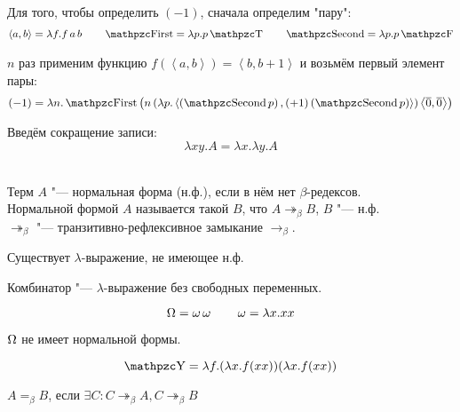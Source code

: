 Для того, чтобы определить $(-1)$, сначала определим "пару":
\begin{align*}
    \left<a,b\right> = \lambda f.f \mathinner{a} b \qquad
    \comb{First} = \lambda p . p \T \qquad
    \comb{Second} = \lambda p . p \F
\end{align*}

$n$ раз применим функцию $f\left(\left<a,b\right>\right) = \left<b,b+1\right>$ и возьмём первый элемент пары:
\[
    (-1) = \lambda n . \comb{First}
        \left(n \mathinner{(\lambda p . \left<\left(\comb{Second} p\right), \mathinner{(+1)} (\comb{Second} p)\right>)}
        \left<\overline{0},\overline{0}\right>\right)
\]

Введём сокращение записи:
\[
    \lambda x y . A = \lambda x . \lambda y . A
\]

\begin{definition} \mbox{} \\
    Терм $A$ "--- нормальная форма (н.ф.), если в нём нет $\beta$-редексов. \\
    Нормальной формой $A$ называется такой $B$, что $A \twoheadrightarrow_{\beta} B$, $B$ "--- н.ф. \\
    $\twoheadrightarrow_{\beta}$ "--- транзитивно-рефлексивное замыкание $\rightarrow_{\beta}$.
\end{definition}

\begin{statement}
    Существует $\lambda$-выражение, не имеющее н.ф.
\end{statement}

\begin{definition}[комбинатор]
    Комбинатор "--- $\lambda$-выражение без свободных переменных.
\end{definition}

\begin{definition}
\[
    \operatorname{\Omega} = \operatorname{\omega} \operatorname{\omega} \qquad
    \operatorname{\omega} = \lambda x . x x
\]
\end{definition}

$\operatorname{\Omega}$ не имеет нормальной формы.

\begin{definition}
    \[
        \comb Y = \lambda f . (\lambda x . f (x x)) (\lambda x . f (x x))
    \]
\end{definition}

\begin{definition}
    $A=_{\beta}B$, если $\exists C : C \twoheadrightarrow_{\beta} A, C \twoheadrightarrow_{\beta}B$
\end{definition}

